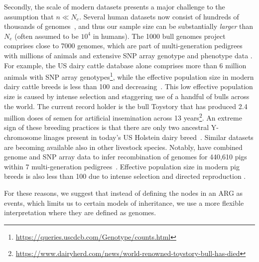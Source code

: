 \documentclass{article}
\begin{document}
Secondly, the scale of modern datasets presents a major challenge
to the assumption that $n \ll N_e$.
Several human datasets now consist of hundreds of thousands of
genomes~\citep{bycroft2018genome,karczewski2020mutational,tanjo2021practical},
and thus our sample size can be substantially \emph{larger} than $N_e$
(often assumed to be $10^4$ in humans).
The 1000 bull genomes project~\citep{hayes20191000}
comprises close to 7000 genomes, which are part of multi-generation pedigrees
with millions of animals and extensive SNP array genotype and phenotype
data \citep[e.g.][]{Cesarani2022}.
For example,
the US dairy cattle database alone comprises more than 6 million
animals with SNP array
genotypes\footnote{\url{https://queries.uscdcb.com/Genotype/counts.html}},
while the effective population size in modern dairy cattle breeds is
less than 100 and decreasing~\citep{MacLeod2013,Makanjuola2020}.
This low effective population size is caused by intense selection and
staggering use of a handful of bulls across the world. The current record
holder is the bull Toystory that has produced 2.4 million doses of semen
for artificial insemination across
13 years\footnote{\url{https://www.dairyherd.com/news/world-renowned-toystory-bull-has-died}}.
An extreme sign of these breeding practices is that there are only two ancestral
Y-chromosome linages present in today's US Holstein dairy breed~\citep{Yue2015}.
Similar datasets are becoming available also in other livestock species.
Notably, \citet{RosFreixedes2022} have combined genome
and SNP array data to infer recombination of genomes for 440,610 pigs within
7 multi-generation pedigrees~\citep{whalen2018,Johnsson2021,Ros-Freixedes2020}.
Effective population size in modern pig breeds is also less than 100 due to
intense selection and directed reproduction \citep{Hall2016,Porcnic2016}.

For these reasons, we suggest that instead of defining the nodes in an
ARG as events, which limits us to certain models of inheritance,
we use a more flexible interpretation where they are defined as genomes.
\end{document}
